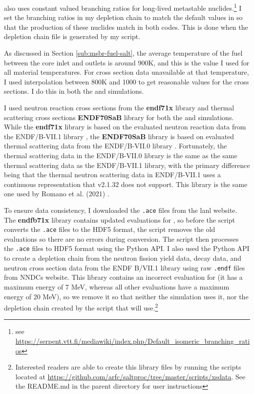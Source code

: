 \SerpentTWO also uses constant valued branching ratios for long-lived metastable
nuclides.\footnote{see \url{https://serpent.vtt.fi/mediawiki/index.php/Default_isomeric_branching_ratios}}
I set the branching ratios in my \OpenMC depletion chain to match the default
values in
\SerpentTWO so that the production of these nuclides match in both codes.
This is done when the depletion chain file is generated by my script.

As discussed in Section \ref{sub:msbr-fuel-salt}, the average temperature of the
fuel between the core inlet and outlets is around 900K, and this is the value I used
for all material temperatures. For cross section data
unavailable at that temperature, I used interpolation between 800K and 1000
to get reasonable values for the cross sections. I do this in both the \OpenMC
and \SerpentTWO simulations.

I used neutron reaction cross sections from the {\bf endf71x} \cite{conlin_continuous_2013} library and
thermal scattering cross sections {\bf ENDF70SaB} \cite{trellue_release_2008} library
for both the \SerpentTWO and \OpenMC simulations. While the
{\bf endf71x} library is based on the evaluated neutron reaction data from the ENDF/B-VII.1 library \cite{chadwick_endf/b-vii.1_2011},
the {\bf ENDF70SaB} library is based on evaluated thermal scattering data from the ENDF/B-VII.0 library \cite{chadwick_endfb-vii0_2006}.
Fortunately, the thermal scattering data in the ENDF/B-VII.0 library is the same as the same thermal
scattering data as the ENDF/B-VII.1 library, with the primary difference being that the thermal
neutron scattering data in ENDF/B-VII.1 uses a continuous representation
that \SerpentTWO v2.1.32 does not support. This library is the same one used
by Romano et al. (2021) \cite{romano_depletion_2021}.

To ensure data consistency, I downloaded the \verb,.ace, files from the \Gls{lanl}
website. The {\bf endfb71x} library contains updated evaluations for , so
before the script converts the \verb,.ace, files to the HDF5 format,
the script removes the old  evaluations so there are no errors
during conversion. The script then processes the \verb,.ace, files to
HDF5 format using the \OpenMC Python
API. I also used the Python API to create a depletion chain from the
neutron fission yield data, decay data, and neutron cross
section data from the ENDF B/VII.1 library using raw \verb,.endf, files from
NNDCs website. This library contains an incorrect evaluation for 
(it has a maximum energy of 7 MeV, whereas all other evaluations have a maximum energy
of 20 MeV), so we remove it so that neither the \SerpentTWO simulation uses it,
nor the depletion chain created by the script that \OpenMC will use.\footnote{Interested readers are able to
create this library files by running the scripts located at
\url{https://github.com/arfc/saltproc/tree/master/scripts/xsdata}. See
the README.md in the parent directory for user instructions}

